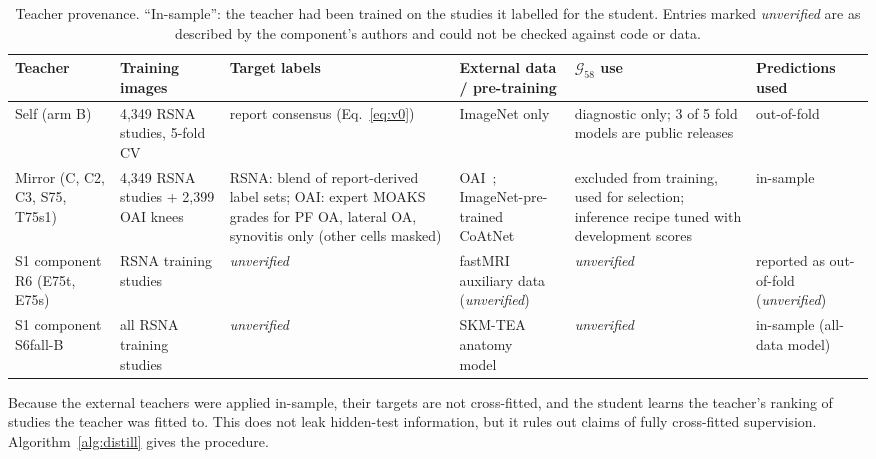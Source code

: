 \documentclass{ieeeaccess}
\newcommand{\gold}{$\mathcal{G}_{58}$}
\begin{document}
\begin{table}[!t]
\centering
\caption{Teacher provenance. ``In-sample'': the teacher had been trained on the studies it labelled for the student.
Entries marked \emph{unverified} are as described by the component's authors and could not be checked against code or
data.}
\label{tab:provenance}
\footnotesize
\setlength{\tabcolsep}{3pt}
\begin{tabular}{p{2.3cm}p{3.0cm}p{3.6cm}p{2.5cm}p{2.6cm}p{2.4cm}}
\toprule
Teacher & Training images & Target labels & External data / pre-training & \gold{} use & Predictions used\\
\midrule
Self (arm B) & 4,349 RSNA studies, 5-fold CV & report consensus (Eq.~\ref{eq:v0}) & ImageNet only & diagnostic only; 3 of 5 fold models are public releases~\cite{goodpjw2026reader} & out-of-fold\\
Mirror (C, C2, C3, S75, T75s1) & 4,349 RSNA studies + 2,399 OAI knees~\cite{nartaa2026mirror} & RSNA: blend of report-derived label sets; OAI: expert MOAKS grades for PF OA, lateral OA, synovitis only (other cells masked) & OAI~\cite{peterfy2008oai}; ImageNet-pre-trained CoAtNet & excluded from training, used for selection; inference recipe tuned with development scores & in-sample\\
S1 component R6 (E75t, E75s) & RSNA training studies~\cite{heliosli2026blend} & \emph{unverified} & fastMRI auxiliary data~\cite{zbontar2018fastmri} (\emph{unverified}) & \emph{unverified} & reported as out-of-fold (\emph{unverified})\\
S1 component S6fall-B & all RSNA training studies~\cite{nartaa2026s6} & \emph{unverified} & SKM-TEA anatomy model~\cite{desai2021skmtea} & \emph{unverified} & in-sample (all-data model)\\
\bottomrule
\end{tabular}
\end{table}

Because the external teachers were applied in-sample, their targets are not cross-fitted, and the student learns the
teacher's ranking of studies the teacher was fitted to. This does not leak hidden-test information, but it rules out
claims of fully cross-fitted supervision. Algorithm~\ref{alg:distill} gives the procedure.
\end{document}
